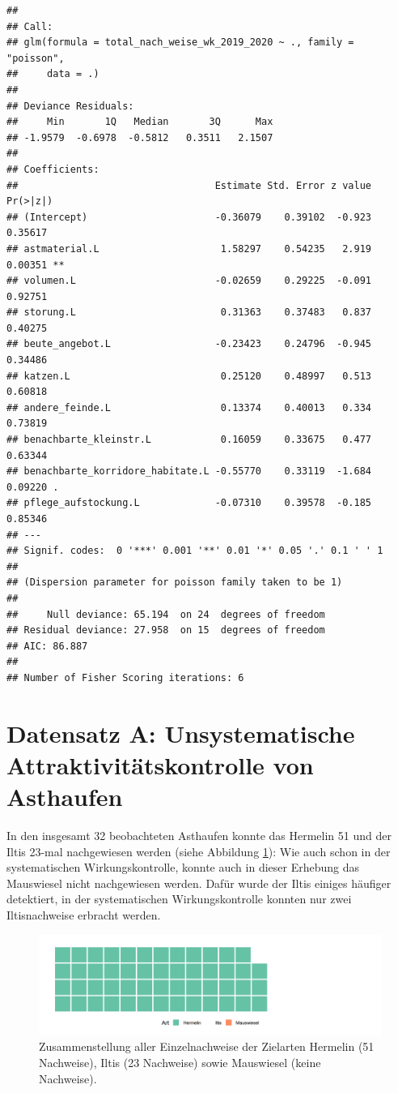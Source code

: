 \documentclass[
  oneside]{scrbook}
\begin{document}
\begin{verbatim}
## 
## Call:
## glm(formula = total_nach_weise_wk_2019_2020 ~ ., family = "poisson", 
##     data = .)
## 
## Deviance Residuals: 
##     Min       1Q   Median       3Q      Max  
## -1.9579  -0.6978  -0.5812   0.3511   2.1507  
## 
## Coefficients:
##                                  Estimate Std. Error z value Pr(>|z|)   
## (Intercept)                      -0.36079    0.39102  -0.923  0.35617   
## astmaterial.L                     1.58297    0.54235   2.919  0.00351 **
## volumen.L                        -0.02659    0.29225  -0.091  0.92751   
## storung.L                         0.31363    0.37483   0.837  0.40275   
## beute_angebot.L                  -0.23423    0.24796  -0.945  0.34486   
## katzen.L                          0.25120    0.48997   0.513  0.60818   
## andere_feinde.L                   0.13374    0.40013   0.334  0.73819   
## benachbarte_kleinstr.L            0.16059    0.33675   0.477  0.63344   
## benachbarte_korridore_habitate.L -0.55770    0.33119  -1.684  0.09220 . 
## pflege_aufstockung.L             -0.07310    0.39578  -0.185  0.85346   
## ---
## Signif. codes:  0 '***' 0.001 '**' 0.01 '*' 0.05 '.' 0.1 ' ' 1
## 
## (Dispersion parameter for poisson family taken to be 1)
## 
##     Null deviance: 65.194  on 24  degrees of freedom
## Residual deviance: 27.958  on 15  degrees of freedom
## AIC: 86.887
## 
## Number of Fisher Scoring iterations: 6
\end{verbatim}

\hypertarget{datensatz-a-unsystematische-attraktivituxe4tskontrolle-von-asthaufen-1}{%
\section{Datensatz A: Unsystematische Attraktivitätskontrolle von Asthaufen}\label{datensatz-a-unsystematische-attraktivituxe4tskontrolle-von-asthaufen-1}}

In den insgesamt 32 beobachteten Asthaufen konnte das Hermelin 51 und der Iltis 23-mal nachgewiesen werden (siehe Abbildung \ref{fig:wirkungskontrollespontaneinzelnachweisewaffle}): Wie auch schon in der systematischen Wirkungskontrolle, konnte auch in dieser Erhebung das Mauswiesel nicht nachgewiesen werden. Dafür wurde der Iltis einiges häufiger detektiert, in der systematischen Wirkungskontrolle konnten nur zwei Iltisnachweise erbracht werden.



\begin{figure}
\includegraphics[width=1\linewidth]{images/wirkungskontrolle_spontan_einzelnachweise_waffle} \caption{Zusammenstellung aller Einzelnachweise der Zielarten Hermelin (51 Nachweise), Iltis (23 Nachweise) sowie Mauswiesel (keine Nachweise).}\label{fig:wirkungskontrollespontaneinzelnachweisewaffle}
\end{figure}
\end{document}
